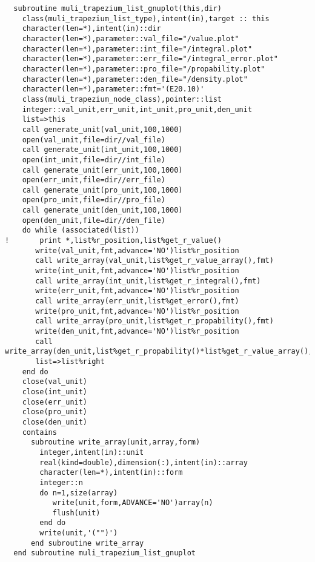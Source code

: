 \begin{Verbatim}
  subroutine muli_trapezium_list_gnuplot(this,dir)
    class(muli_trapezium_list_type),intent(in),target :: this
    character(len=*),intent(in)::dir
    character(len=*),parameter::val_file="/value.plot"
    character(len=*),parameter::int_file="/integral.plot"
    character(len=*),parameter::err_file="/integral_error.plot"
    character(len=*),parameter::pro_file="/propability.plot"
    character(len=*),parameter::den_file="/density.plot"
    character(len=*),parameter::fmt='(E20.10)'
    class(muli_trapezium_node_class),pointer::list
    integer::val_unit,err_unit,int_unit,pro_unit,den_unit
    list=>this
    call generate_unit(val_unit,100,1000)
    open(val_unit,file=dir//val_file)
    call generate_unit(int_unit,100,1000)
    open(int_unit,file=dir//int_file)
    call generate_unit(err_unit,100,1000)
    open(err_unit,file=dir//err_file)
    call generate_unit(pro_unit,100,1000)
    open(pro_unit,file=dir//pro_file)
    call generate_unit(den_unit,100,1000)
    open(den_unit,file=dir//den_file)
    do while (associated(list))
!       print *,list%r_position,list%get_r_value()
       write(val_unit,fmt,advance='NO')list%r_position
       call write_array(val_unit,list%get_r_value_array(),fmt)
       write(int_unit,fmt,advance='NO')list%r_position
       call write_array(int_unit,list%get_r_integral(),fmt)
       write(err_unit,fmt,advance='NO')list%r_position
       call write_array(err_unit,list%get_error(),fmt)
       write(pro_unit,fmt,advance='NO')list%r_position
       call write_array(pro_unit,list%get_r_propability(),fmt)
       write(den_unit,fmt,advance='NO')list%r_position
       call write_array(den_unit,list%get_r_propability()*list%get_r_value_array(),fmt)
       list=>list%right
    end do
    close(val_unit)
    close(int_unit)
    close(err_unit)
    close(pro_unit)
    close(den_unit)
    contains
      subroutine write_array(unit,array,form)
        integer,intent(in)::unit
        real(kind=double),dimension(:),intent(in)::array
        character(len=*),intent(in)::form
        integer::n
        do n=1,size(array)
           write(unit,form,ADVANCE='NO')array(n)
           flush(unit)
        end do
        write(unit,'("")')
      end subroutine write_array
  end subroutine muli_trapezium_list_gnuplot
\end{Verbatim}

